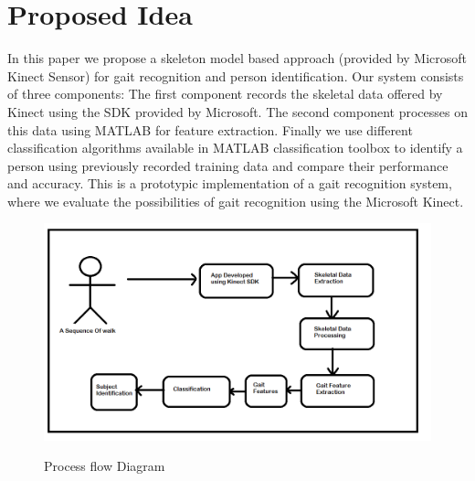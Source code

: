 \section{Proposed Idea} \label{Proposed Idea}
\noindent In this paper we propose a skeleton model based approach (provided by Microsoft Kinect Sensor) for gait recognition and person identification. Our system consists of three components: The first component records the skeletal data offered by Kinect using the SDK provided by Microsoft. The second component processes on this data using MATLAB for feature extraction. Finally we use different classification algorithms available in MATLAB classification toolbox to identify a person using previously recorded training data and compare their performance and accuracy. This is a prototypic implementation of a gait recognition system, where we evaluate the possibilities of gait recognition using the Microsoft Kinect.



\begin{figure}[H]
{\includegraphics[scale=0.65]{Figprocessflow.png}}
\caption{Process flow Diagram}
\end{figure}


